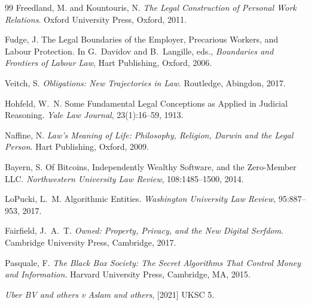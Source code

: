 \documentclass[11pt,a4paper]{article}
\theoremstyle{remark}
\begin{document}
\begin{thebibliography}{99}
Freedland, M. and Kountouris, N.
\newblock \emph{The Legal Construction of Personal Work Relations}.
\newblock Oxford University Press, Oxford, 2011.

Fudge, J.
\newblock The Legal Boundaries of the Employer, Precarious Workers,
  and Labour Protection.
\newblock In G.~Davidov and B.~Langille, eds., \emph{Boundaries and
  Frontiers of Labour Law}, Hart Publishing, Oxford, 2006.

Veitch, S.
\newblock \emph{Obligations: New Trajectories in Law}.
\newblock Routledge, Abingdon, 2017.

Hohfeld, W.~N.
\newblock Some Fundamental Legal Conceptions as Applied in Judicial
  Reasoning.
\newblock \emph{Yale Law Journal}, 23(1):16--59, 1913.

Naffine, N.
\newblock \emph{Law's Meaning of Life: Philosophy, Religion, Darwin
  and the Legal Person}.
\newblock Hart Publishing, Oxford, 2009.

Bayern, S.
\newblock Of Bitcoins, Independently Wealthy Software, and the
  Zero-Member LLC.
\newblock \emph{Northwestern University Law Review}, 108:1485--1500, 2014.

LoPucki, L.~M.
\newblock Algorithmic Entities.
\newblock \emph{Washington University Law Review}, 95:887--953, 2017.

Fairfield, J.~A.~T.
\newblock \emph{Owned: Property, Privacy, and the New Digital
  Serfdom}.
\newblock Cambridge University Press, Cambridge, 2017.

Pasquale, F.
\newblock \emph{The Black Box Society: The Secret Algorithms That
  Control Money and Information}.
\newblock Harvard University Press, Cambridge, MA, 2015.

\emph{Uber BV and others v Aslam and others}, [2021] UKSC 5.

\end{thebibliography}
\end{document}
